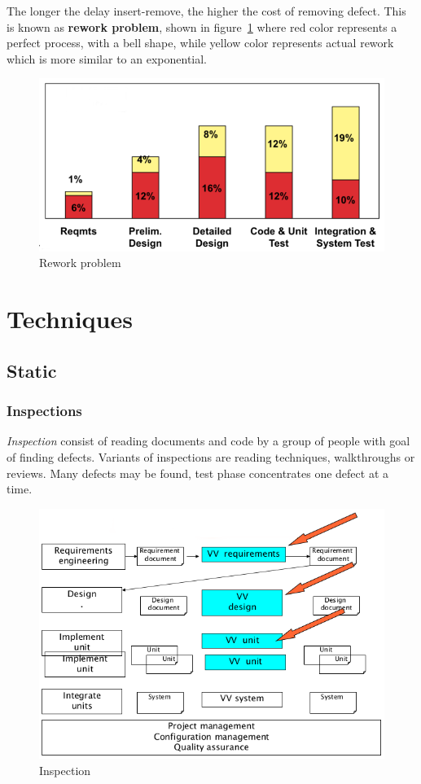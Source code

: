The longer the delay insert-remove, the higher the cost of removing defect. This is known as \textbf{rework problem}, shown in figure~\ref{img:rework_problem} where red color represents a perfect process, with a bell shape, while yellow color represents actual rework which is more similar to an exponential.

\begin{figure}[hbtp]
\centering
\includegraphics[scale=0.35]{images/rework_problem.png}
\caption{Rework problem}
\label{img:rework_problem}
\end{figure}

\section{Techniques}
\subsection{Static}
\subsubsection{Inspections}
\emph{Inspection} consist of reading documents and code by a group of people with goal of finding defects. Variants of inspections are reading techniques, walkthroughs or reviews. Many defects may be found, test phase concentrates one defect at a time.

\begin{figure}[hbtp]
\centering
\includegraphics[scale=0.35]{images/v_v_inspection.png}
\caption{Inspection}
\label{img:v_v_inspection}
\end{figure}

